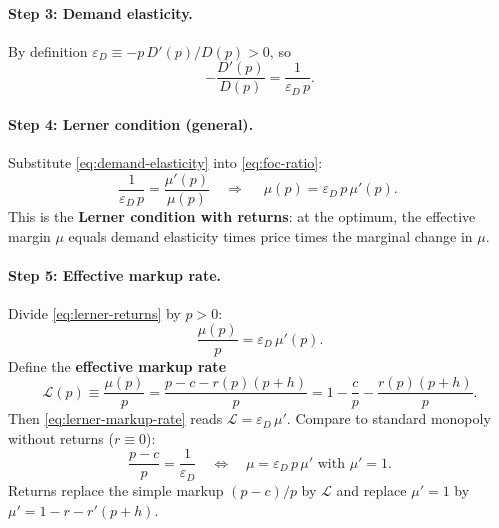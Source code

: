 \documentclass[11pt]{article}
\begin{document}
\paragraph{Step 3: Demand elasticity.}
By definition $\varepsilon_D \equiv -p\,D'(p)/D(p) > 0$, so
\begin{equation}
  -\frac{D'(p)}{D(p)} = \frac{1}{\varepsilon_D\, p}.
  \label{eq:demand-elasticity}
\end{equation}

\paragraph{Step 4: Lerner condition (general).}
Substitute \eqref{eq:demand-elasticity} into \eqref{eq:foc-ratio}:
\[
  \frac{1}{\varepsilon_D\, p} = \frac{\mu'(p)}{\mu(p)}
  \quad\Rightarrow\quad
  \boxed{\;\mu(p) = \varepsilon_D\, p\,\mu'(p).\;}
  \label{eq:lerner-returns}
\]
This is the \textbf{Lerner condition with returns}: at the optimum, the
effective margin $\mu$ equals demand elasticity times price times the
marginal change in $\mu$.

\paragraph{Step 5: Effective markup rate.}
Divide \eqref{eq:lerner-returns} by $p>0$:
\begin{equation}
  \frac{\mu(p)}{p}
  = \varepsilon_D\,\mu'(p).
  \label{eq:lerner-markup-rate}
\end{equation}
Define the \textbf{effective markup rate}
\[
  \mathcal{L}(p) \equiv \frac{\mu(p)}{p}
  = \frac{p - c - r(p)(p+h)}{p}
  = 1 - \frac{c}{p} - \frac{r(p)(p+h)}{p}.
\]
Then \eqref{eq:lerner-markup-rate} reads
$\mathcal{L} = \varepsilon_D\,\mu'$.
Compare to standard monopoly without returns ($r\equiv 0$):
\[
  \frac{p-c}{p} = \frac{1}{\varepsilon_D}
  \quad\Longleftrightarrow\quad
  \mu = \varepsilon_D\, p\,\mu' \text{ with } \mu'=1.
\]
Returns replace the simple markup $(p-c)/p$ by $\mathcal{L}$ and replace
$\mu'=1$ by $\mu' = 1 - r - r'(p+h)$.
\end{document}

